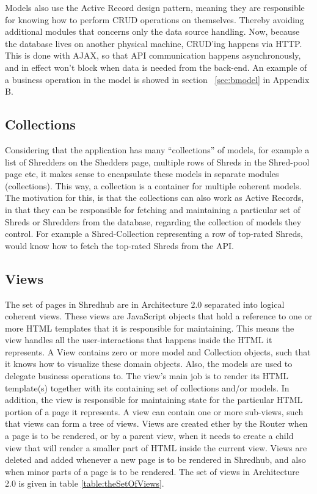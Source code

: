 Models also use the Active Record design pattern, meaning they are responsible for knowing how to perform CRUD operations on themselves. Thereby avoiding additional modules that concerns only the data source handling. Now, because the database lives on another physical machine, CRUD'ing happens via HTTP. This is done with AJAX, so that API communication happens asynchronously, and in effect won't block when data is needed from the back-end. An example of a business operation in the model is showed in section ~\ref{sec:bmodel} in Appendix B. 

\subsection{Collections}
Considering that the application has many ``collections'' of models, for example a list of Shredders on the Shedders page, multiple rows of Shreds in the Shred-pool page etc, it makes sense to encapsulate these models in separate modules (collections). This way, a collection is a container for multiple coherent models. The motivation for this, is that the collections can also work as Active Records, in that they can be responsible for fetching and maintaining a particular set of Shreds or Shredders from the database, regarding the collection of models they control. For example a Shred-Collection representing a row of top-rated Shreds, would know how to fetch the top-rated Shreds from the API. 

\subsection{Views}
The set of pages in Shredhub are in Architecture 2.0 separated into logical coherent views. These views are JavaScript objects that hold a reference to one or more HTML templates that it is responsible for maintaining. This means the view handles all the user-interactions that happens inside the HTML it represents.  A View contains zero or more model and Collection objects, such that it knows how to visualize these domain objects. Also, the models are used to delegate business operations to. The view's main job is to render its HTML template(s) together with its containing set of collections and/or models. In addition, the view is responsible for maintaining state for the particular HTML portion of a page it represents. A view can contain one or more sub-views, such that views can form a tree of views. Views are created ether by the Router when a page is to be rendered, or by a parent view, when it needs to create a child view that will render a smaller part of HTML inside the current view. Views are deleted and added whenever a new page is to be rendered in Shredhub, and also when minor parts of a page is to be rendered. The set of views in Architecture 2.0 is given in table \ref{table:theSetOfViews}.

